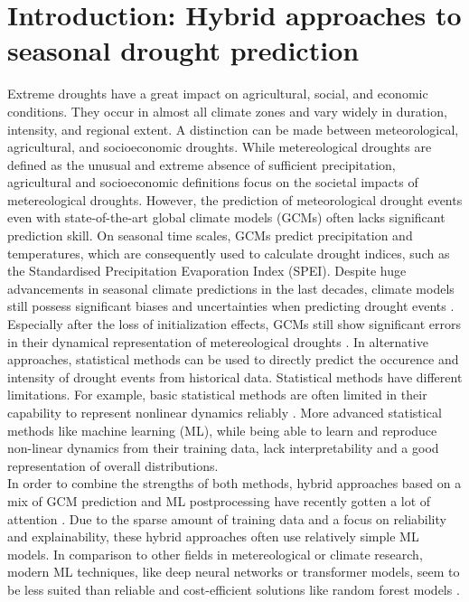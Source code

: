 \documentclass[ba-lentz.tex]{subfile}
\begin{document}
{\let\clearpage\relax \chapter{Introduction: Hybrid approaches to seasonal drought prediction}}\label{introduction}

\noindent Extreme droughts have a great impact on agricultural, social, and economic conditions.
They occur in almost all climate zones and vary widely in duration, intensity, and regional extent.
A distinction can be made between meteorological, agricultural, and socioeconomic droughts.
While metereological droughts are defined as the unusual and extreme absence of sufficient precipitation, agricultural and socioeconomic definitions focus on the societal impacts of metereological droughts.
However, the prediction of meteorological drought events even with state-of-the-art global climate models (GCMs) often lacks significant prediction skill.
On seasonal time scales, GCMs predict precipitation and temperatures, which are consequently used to calculate drought indices, such as the Standardised Precipitation Evaporation Index (SPEI).
Despite huge advancements in seasonal climate predictions in the last decades, climate models still possess significant biases and uncertainties when predicting drought events \parencite{wu_dynamic-lstm_2022}.
Especially after the loss of initialization effects, GCMs still show significant errors in their dynamical representation of metereological droughts \parencite{wu_dynamic-lstm_2022}.
In alternative approaches, statistical methods can be used to directly predict the occurence and intensity of drought events from historical data.
Statistical methods have different limitations.
For example, basic statistical methods are often limited in their capability to represent nonlinear dynamics reliably \parencite{hao_seasonal_2018}.
More advanced statistical methods like machine learning (ML), while being able to learn and reproduce non-linear dynamics from their training data, lack interpretability and a good representation of overall distributions. \\
In order to combine the strengths of both methods, hybrid approaches based on a mix of GCM prediction and ML postprocessing have recently gotten a lot of attention \parencite{li_post-processing_2021,wu_dynamic-lstm_2022}.
Due to the sparse amount of training data and a focus on reliability and explainability, these hybrid approaches often use relatively simple ML models.
In comparison to other fields in metereological or climate research, modern ML techniques, like deep neural networks or transformer models, seem to be less suited than reliable and cost-efficient solutions like random forest models \parencite{thomasson_improving_2023,feng_bias_2024,karsisto_post-processing_2025}.
\end{document}
